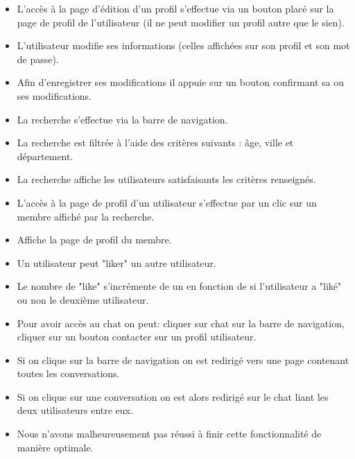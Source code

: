 \begin{itemize}
 \item L'accès à la page d'édition d'un profil s'effectue via un bouton placé sur la page de profil de l'utilisateur (il ne peut modifier un profil autre que le sien).
 \item L'utilisateur modifie ses informations (celles affichées sur son profil et son mot de passe).
 \item Afin d'enregistrer ses modifications il appuie sur un bouton confirmant sa ou ses modifications.
\end{itemize}


\begin{itemize}
 \item La recherche s'effectue via la barre de navigation.
 \item La recherche est filtrée à l'aide des critères suivants : âge, ville et département.
 \item La recherche affiche les utilisateurs satisfaisants les critères renseignés.
\end{itemize}

\begin{itemize}
 \item L'accès à la page de profil d'un utilisateur s'effectue par un clic sur un membre affiché par la recherche.
 \item Affiche la page de profil du membre.
\end{itemize}

\begin{itemize}
 \item Un utilisateur peut "liker" un autre utilisateur.
 \item Le nombre de "like" s'incrémente de un en fonction de si l'utilisateur a "liké" ou non le deuxième utilisateur.
\end{itemize}


\begin{itemize}
\item Pour avoir accès au chat on peut: cliquer sur chat sur la barre de navigation, cliquer sur un bouton contacter sur un profil utilisateur.
\item Si on clique sur la barre de navigation on est redirigé vers une page contenant toutes les conversations.
\item Si on clique sur une conversation on est alors redirigé sur le chat liant les deux utilisateurs entre eux.
\item Nous n'avons malheureusement pas réussi à finir cette fonctionnalité de manière optimale.
\end{itemize}


